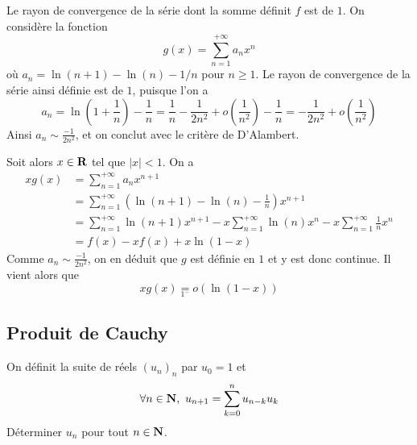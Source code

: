 \begin{correction}
Le rayon de convergence de la série dont la somme définit $f$ est de $1.$
On considère la fonction 
\[
    g(x)=\displaystyle\sum_{n=1}^{+\infty}a_nx^n
\] où $a_n=\ln(n+1)-\ln(n)-1/n$ pour $n\geq 1$.
Le rayon de convergence de la série ainsi définie est de $1$, puisque l'on a \[a_n=\ln\left(1+\frac1n\right)-\frac1n=\frac1n-\frac1{2n^2}+o\left(\frac1{n^2}\right)-\frac1n=-\frac1{2n^2}+o\left(\frac1{n^2}\right)\] 
Ainsi $a_n\sim\frac{-1}{2n^2}$, et on conclut avec le critère de D'Alambert.

Soit alors $x\in\operatorname{\mathbf{R}}$ tel que $|x|<1$. On a 
\begin{align*}
	xg(x)&=\displaystyle\sum_{n=1}^{+\infty}a_nx^{n+1}\\
		&=\displaystyle\sum_{n=1}^{+\infty}\left(\ln(n+1)-\ln(n)-\frac1n\right)x^{n+1}\\
		&=\displaystyle\sum_{n=1}^{+\infty}\ln(n+1)x^{n+1}-x\displaystyle\sum_{n=1}^{+\infty}\ln(n)x^n-x\displaystyle\sum_{n=1}^{+\infty}\frac1nx^n\\
		&=f(x)-xf(x)+x\ln(1-x)
\end{align*}
Comme $a_n\sim\frac{-1}{2n^2}$, on en déduit que $g$ est définie en $1$ et y est donc continue. Il vient alors que \[xg(x)\underset{1^{-}}{=}o(\ln(1-x))\]
\end{correction}


\subsection{Produit de Cauchy}
\begin{exercice}
	On définit la suite de réels $(u_n)_n$ par $u_0=1$ et \[\forall n\in\N,\ u_{n+1}=\sum_{k=0}^nu_{n-k}u_k\]
	Déterminer $u_n$ pour tout $n\in\operatorname{\mathbf{N}}$.
\end{exercice}

